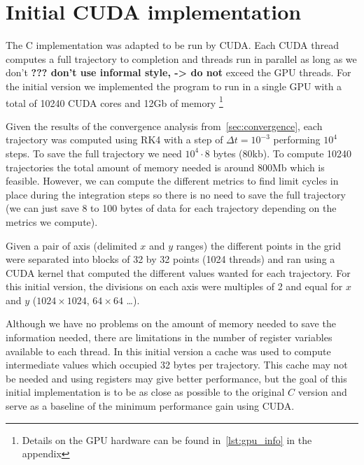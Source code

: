 
\section{Initial CUDA implementation}

The C implementation was adapted to be run by CUDA. Each CUDA thread computes a full trajectory to completion and threads run in parallel as long as we don't
{\bf ??? don't use informal style, -> do not}
exceed the GPU threads. For the initial version we implemented the program to run in a single GPU with a total of 10240 CUDA cores and 12Gb of memory 
\footnote{Details on the GPU hardware can be found in~\cref{lst:gpu_info} in the appendix}

Given the results of the convergence analysis from~\cref{sec:convergence}, each trajectory was computed using RK4 with a step of $\Delta t=10^{-3}$ performing $10^4$ steps. To save the full trajectory we need $10^4\cdot 8$ bytes (80kb). To compute 10240 trajectories the total amount of memory needed is around 800Mb which is feasible. However, we can compute the different metrics to find limit cycles in place during the integration steps so there is no need to save the full trajectory (we can just save 8 to 100 bytes of data for each trajectory depending on the metrics we compute).

Given a pair of axis (delimited $x$ and $y$ ranges) the different points in the grid were separated into blocks of 32 by 32 points (1024 threads) and ran using a CUDA kernel that computed the different values wanted for each trajectory. For this initial version, the divisions on each axis were multiples of 2 and equal for $x$ and $y$ ($1024\times 1024$, $64\times 64$ \dots ).

Although we have no problems on the amount of memory needed to save the information needed, there are limitations in the number of register variables available to each thread. In this initial version a cache was used to compute intermediate values which occupied 32 bytes per trajectory. This cache may not be needed and using registers may give better performance, but the goal of this initial implementation is to be as close as possible to the original $C$ version and serve as a baseline of the minimum performance gain using CUDA.